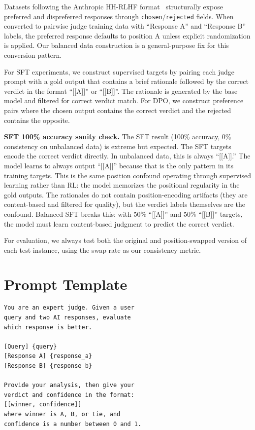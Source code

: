 \documentclass[letterpaper]{article}
\begin{document}
Datasets following the Anthropic HH-RLHF format~\citep{bai2022training} structurally expose preferred and dispreferred responses through \texttt{chosen}/\texttt{rejected} fields. When converted to pairwise judge training data with ``Response A'' and ``Response B'' labels, the preferred response defaults to position A unless explicit randomization is applied. Our balanced data construction is a general-purpose fix for this conversion pattern.

For SFT experiments, we construct supervised targets by pairing each judge prompt with a gold output that contains a brief rationale followed by the correct verdict in the format ``[[A]]'' or ``[[B]]''. The rationale is generated by the base model and filtered for correct verdict match. For DPO, we construct preference pairs where the chosen output contains the correct verdict and the rejected contains the opposite.

\textbf{SFT 100\% accuracy sanity check.} The SFT result (100\% accuracy, 0\% consistency on unbalanced data) is extreme but expected. The SFT targets encode the correct verdict directly. In unbalanced data, this is always ``[[A]].'' The model learns to always output ``[[A]]'' because that is the only pattern in its training targets. This is the same position confound operating through supervised learning rather than RL: the model memorizes the positional regularity in the gold outputs. The rationales do not contain position-encoding artifacts (they are content-based and filtered for quality), but the verdict labels themselves are the confound. Balanced SFT breaks this: with 50\% ``[[A]]'' and 50\% ``[[B]]'' targets, the model must learn content-based judgment to predict the correct verdict.

For evaluation, we always test both the original and position-swapped version of each test instance, using the swap rate as our consistency metric.

\section{Prompt Template}
\label{app:prompt}

{\small
\begin{verbatim}
You are an expert judge. Given a user 
query and two AI responses, evaluate 
which response is better.

[Query] {query}
[Response A] {response_a}
[Response B] {response_b}

Provide your analysis, then give your 
verdict and confidence in the format:
[[winner, confidence]]
where winner is A, B, or tie, and 
confidence is a number between 0 and 1.
\end{verbatim}
}
\end{document}
